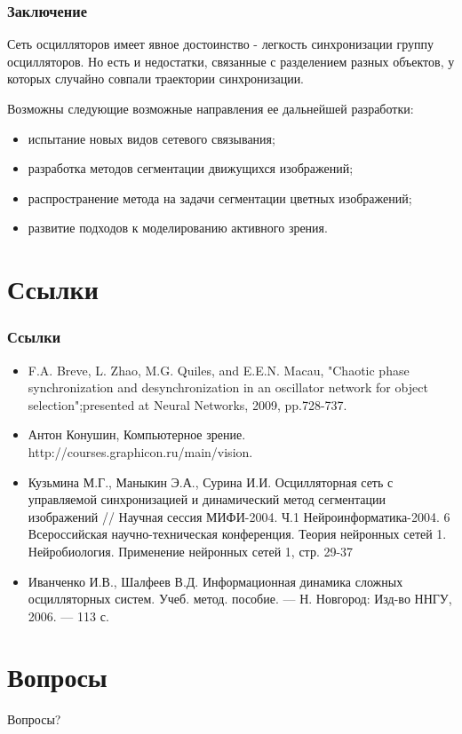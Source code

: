 \documentclass{beamer}
\begin{document}
\begin{frame}
\frametitle{Заключение}

Сеть осцилляторов имеет явное достоинство - легкость синхронизации группу осцилляторов. Но есть и недостатки, связанные с разделением разных объектов, у которых случайно совпали траектории синхронизации.
\medskip

Возможны следующие возможные направления  ее дальнейшей разработки:
\begin{itemize}
\item испытание новых видов сетевого связывания;
\item разработка методов сегментации движущихся изображений;
\item распространение метода на задачи сегментации цветных изображений;
\item развитие подходов к моделированию активного зрения.
\end{itemize}
\end{frame}
\section{Ссылки}

\begin{frame}
\frametitle{Ссылки}

\begin{itemize}
\item F.A. Breve, L. Zhao, M.G. Quiles,  and E.E.N. Macau, "Chaotic phase synchronization and desynchronization in an oscillator network for object selection";presented at Neural Networks, 2009, pp.728-737.
\item Антон Конушин, Компьютерное зрение. http://courses.graphicon.ru/main/vision.
\item Кузьмина М.Г., Маныкин Э.А., Сурина И.И. Осцилляторная сеть с управляемой синхронизацией и динамический метод сегментации изображений // Научная сессия МИФИ-2004. Ч.1 Нейроинформатика-2004. 6 Всероссийская научно-техническая конференция. Теория нейронных сетей 1. Нейробиология. Применение нейронных сетей 1, стр. 29-37
\item Иванченко И.В., Шалфеев В.Д. Информационная динамика сложных осцилляторных систем. Учеб. метод. пособие. — Н. Новгород: Изд-во ННГУ, 2006. — 113 с.
\end{itemize}\end{frame}

\section{Вопросы}

\begin{frame}
\Huge{\centerline{Вопросы?}}
\end{frame}

\end{document}
